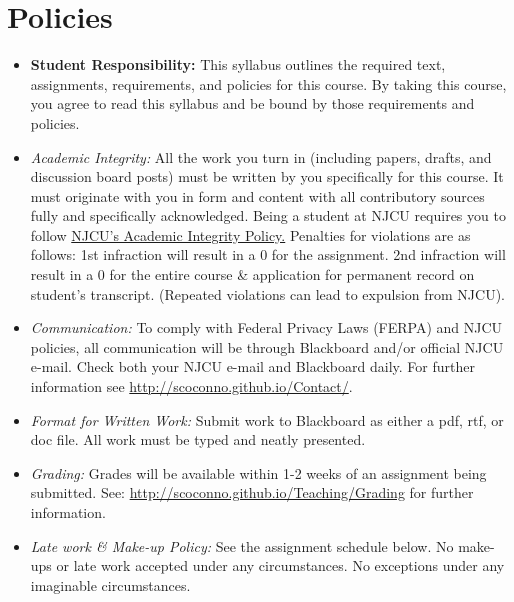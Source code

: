 \documentclass[article,oneside]{memoir}
\begin{document}
\section{Policies}

\begin{itemize}

\item \textbf{Student Responsibility:} This syllabus outlines the required text, assignments, requirements, and policies for this course. By taking this course, you agree to read this syllabus and be bound by those requirements and policies. 

 \item \textit{Academic Integrity:} All the work you turn in (including papers, drafts, and discussion board posts) must be written by you specifically for this course. It must originate with you in form and content with all contributory sources fully and specifically acknowledged. Being a student at NJCU requires you to follow \href{http://scoconno.github.io/Teaching/Plagiarism.pdf}{NJCU's Academic Integrity Policy.} Penalties for violations are as follows: 1st infraction will result in a 0 for the assignment.  2nd infraction will result in a 0 for the entire course \& application for permanent record on student's transcript. (Repeated violations can lead to expulsion from NJCU). 


\item \textit{Communication:} To comply with Federal Privacy Laws (FERPA) and NJCU policies, all communication will be through Blackboard and/or official NJCU e-mail. Check both your NJCU e-mail and Blackboard daily. For further information see \href{http://scoconno.github.io/Contact/}{http://scoconno.github.io/Contact/}.



\item \textit{Format for Written Work:} Submit work to Blackboard as either a pdf, rtf, or doc file. All work must be typed and neatly presented. 



\item \textit{Grading:} Grades will be available within 1-2 weeks of an assignment being submitted. See: \href{http://scoconno.github.io/Teaching/Grading}{http://scoconno.github.io/Teaching/Grading} for further information.


\item \textit{Late work \& Make-up Policy:} See the assignment schedule below. No make-ups or late work accepted under any circumstances. No exceptions under any imaginable circumstances. 



\end{itemize}
\end{document}
